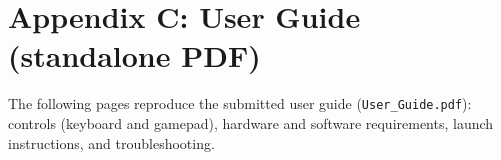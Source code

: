 \documentclass[11pt,a4paper]{article}
\begin{document}
\section{Appendix C: User Guide (standalone PDF)}
\label{app:user-guide-pdf}
\vspace{-2.5ex}
\noindent
The following pages reproduce the submitted user guide (\texttt{User\_Guide.pdf}): controls (keyboard and gamepad), hardware and software requirements, launch instructions, and troubleshooting.
\par\vspace{0.75ex}
\begingroup
\let\clearpage\relax

\endgroup

\end{document}
